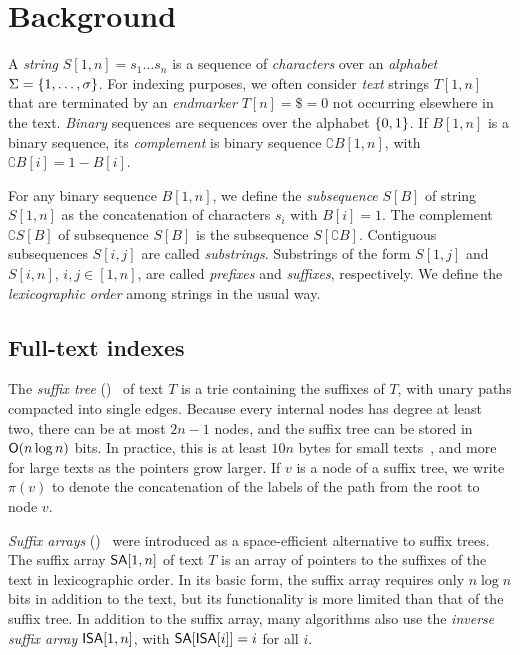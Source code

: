 
\section{Background}

A \emph{string} $S[1,n] = s_{1} \dotso s_{n}$ is a sequence of
\emph{characters} over an \emph{alphabet} $\Sigma = \{ 1, \dotsc, \sigma \}$.
For indexing purposes, we often consider \emph{text} strings $T[1,n]$ that are
terminated by an \emph{endmarker} $T[n] = \$ = 0$ not occurring elsewhere in
the text. \emph{Binary} sequences are sequences over the alphabet $\{ 0,1 \}$.
If $B[1,n]$ is a binary sequence, its \emph{complement} is binary sequence
$\complement{B}[1,n]$, with $\complement{B}[i] = 1 - B[i]$.

For any binary sequence $B[1,n]$, we define the \emph{subsequence} $S[B]$ of
string $S[1,n]$ as the concatenation of characters $s_{i}$ with $B[i] = 1$.
The complement $\complement{S}[B]$ of subsequence $S[B]$ is the subsequence
$S[\complement{B}]$. Contiguous subsequences $S[i,j]$ are called
\emph{substrings}. Substrings of the form $S[1,j]$ and $S[i,n]$, $i,j \in
[1,n]$, are called \emph{prefixes} and \emph{suffixes}, respectively. We
define the \emph{lexicographic order} among strings in the usual way.

\subsection{Full-text indexes}

The \emph{suffix tree} (\ST)~\cite{Weiner1973} of text $T$ is a trie
containing the suffixes of $T$, with unary paths compacted into single edges.
Because every internal nodes has degree at least two, there can be at most
$2n-1$ nodes, and the suffix tree can be stored in $\mathsf{O}(n \log n)$ bits. In
practice, this is at least $10n$ bytes for small texts~\cite{Kurtz1999}, and
more for large texts as the pointers grow larger. If $v$ is a node of a suffix
tree, we write $\pi(v)$ to denote the concatenation of the labels of the path
from the root to node $v$.

\emph{Suffix arrays} (\SA)~\cite{Manber1993} were introduced as a
space-efficient alternative to suffix trees. The suffix array $\mathsf{SA}[1,n]$ of
text $T$ is an array of pointers to the suffixes of the text in lexicographic
order. In its basic form, the suffix array requires only $n \log n$ bits in
addition to the text, but its functionality is more limited than that of the
suffix tree. In addition to the suffix array, many algorithms also use the
\emph{inverse suffix array} $\mathsf{ISA}[1,n]$, with $\mathsf{SA}[\mathsf{ISA}[i]] = i$ for all
$i$.

